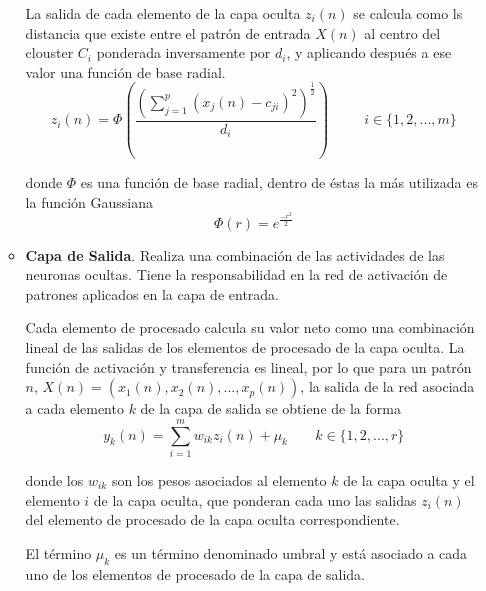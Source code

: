 \documentclass[letterpaper,11pt]{article}
\begin{document}
\begin{enumerate}
\begin{itemize}
        La salida de cada elemento de la capa oculta $z_i (n)$ se calcula como 
        ls distancia que existe entre el patrón de entrada $X (n)$ al centro del 
        clouster $C_i$ ponderada inversamente por $d_i$, y aplicando después a 
        ese valor una función de base radial.
        \begin{equation*}
            z_i (n) = 
            \Phi \left(\frac{\left( \sum^p_{j=1} \left( x_j (n) - c_{ji} 
                                                 \right)^2 \right)^{\frac{1}{2}}}
                            {d_i} \right) \; \; \; \; \; \; \; \; \; 
            i \in \{1, 2, ..., m\}
        \end{equation*}

        donde $\Phi$ es una función de base radial, dentro de éstas la más 
        utilizada es la función Gaussiana 
        \begin{equation*}
            \Phi (r) = e^{\frac{-r^2}{2}}
        \end{equation*}

        \item \textbf{Capa de Salida}. Realiza una combinación de las actividades 
        de las neuronas ocultas. Tiene la responsabilidad en la red de activación 
        de patrones aplicados en la capa de entrada. 

        Cada elemento de procesado calcula su valor neto como una combinación
        lineal de las salidas de los elementos de procesado de la capa oculta.
        La función de activación y transferencia es lineal, por lo que para un 
        patrón $n$, $X(n) = (x_1 (n), x_2 (n), ..., x_p (n))$, la salida de la 
        red asociada a cada elemento $k$ de la capa de salida se obtiene de la 
        forma 
        \begin{equation*}
            y_k (n) = \sum^m_{i=1} w_{ik} z_i (n) + \mu_k \; \; \; \; \; \; \;
            k \in \{1, 2, ..., r\}
        \end{equation*}

        donde los $w_{ik}$ son los pesos asociados al elemento $k$ de la capa 
        oculta y el elemento $i$ de la capa oculta, que ponderan cada uno las 
        salidas $z_i (n)$ del elemento de procesado de la capa oculta 
        correspondiente. 

        El término $\mu_k$ es un término denominado umbral y está asociado a
        cada uno de los elementos de procesado de la capa de salida. 
    \end{itemize}


\end{enumerate}
\end{document}
